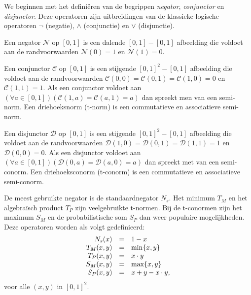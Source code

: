 We beginnen met het defini\"eren van de begrippen \emph{negator}, \emph{conjunctor} en 
\emph{disjunctor}. Deze operatoren zijn uitbreidingen van de klassieke logische operatoren
$\lnot$ (negatie), $\land$ (conjunctie) en $\lor$ (disjunctie).
\begin{definitie}
Een negator $\mathcal{N}$ op $[0,1]$ is een dalende $[0,1] - [0,1]$ afbeelding die voldoet
aan de randvoorwaarden $\mathcal{N}(0)=1$ en $\mathcal{N}(1)=0$. 
\end{definitie}
\begin{definitie}
Een conjunctor $\mathcal{C}$ op $[0,1]$ is een stijgende $[0,1]^2 - [0,1]$ afbeelding die voldoet aan de
randvoorwaarden $\mathcal{C}(0,0)=\mathcal{C}(0,1)=\mathcal{C}(1,0)=0$ en $\mathcal{C}(1,1)=1$. 
Als een conjunctor voldoet aan 
$(\forall a \in [0,1])(\mathcal{C}(1,a)=\mathcal{C}(a,1)=a)$ dan spreekt men van een semi-norm.
Een driehoeksnorm (t-norm) is een commutatieve en associatieve semi-norm.
\end{definitie}
\begin{definitie}
Een disjunctor $\mathcal{D}$ op $[0,1]$ is een stijgende $[0,1]^2 - [0,1]$ afbeelding die voldoet
aan de randvoorwaarden $\mathcal{D}(1,0)=\mathcal{D}(0,1)=\mathcal{D}(1,1)=1$ en 
$\mathcal{D}(0,0)=0$. Als een disjunctor voldoet aan 
$(\forall a \in [0,1])(\mathcal{D}(0,a)=\mathcal{D}(a,0)=a)$ dan spreekt met van een semi-conorm.
Een driehoeksconorm (t-conorm) is een commutatieve en associatieve semi-conorm.
\end{definitie}

De meest gebruikte negator is de standaardnegator $N_s$. Het minimum $T_M$ en het algebra\"isch 
product $T_P$ zijn veelgebruikte t-normen. Bij de t-conormen zijn het maximum $S_M$ en de
probabilistische som $S_P$ dan weer populaire mogelijkheden. Deze operatoren worden als 
volgt gedefinieerd:
$$
\begin{array}{r@{\quad=\quad}l}
N_s(x) & 1 - x \\
T_M(x,y) & \min \{x,y\} \\
T_P(x,y) & x \cdot y \\
S_M(x,y) & \max \{x,y\} \\
S_P(x,y) & x +y - x \cdot y,
\end{array}
$$
voor alle $(x,y)$ in $[0,1]^2$.


